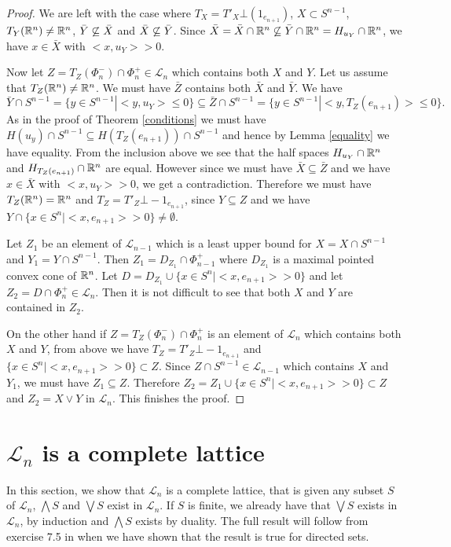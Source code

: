 \documentclass[psamsfonts]{amsart}
\numberwithin{equation}{subsection}
\theoremstyle{plain}
\theoremstyle{definition}
\theoremstyle{remark}
\begin{document}
\begin{proof}
We are left with the case where $T_X = T'_X \bot ( 1_{e_{n + 1}})$,  $X \subset S^{n - 1}$,  $T_Y(\Bbb{R}^n)\not= \Bbb{R}^n$,
$\Bar{Y} \not \subseteq \bar{X}$ and $\Bar{X} \not \subseteq \bar{Y}$. 
  Since  $\bar{X} = \bar{X} \cap \Bbb{R}^n \not\subseteq \bar{Y}  \cap \Bbb{R}^n = H_{u_Y} \cap \Bbb{R}^n$,  we have $x \in \bar{X}$ with $<x, u_Y> > 0$. 


 Now let $Z = T_Z(\Phi_{n}^- )\cap \Phi_{n}^+ \in \mathcal{L}_n$ which contains both $X$ and $Y$. Let us assume that 
 $T_Z(\Bbb{R}^n) \not= \Bbb{R}^n$.  
We must have $\bar{Z}$ contains both $\bar{X}$ and $\bar{Y}$. We have  
{\small $${ \bar{Y} \cap S^{n - 1} = \{y \in S^{n -1} | 
<y, u_Y> \leq 0\} \subseteq \bar{Z} \cap S^{n - 1} = \{y \in S^{n -1} | 
<y, T_Z(e_{n + 1})> \leq 0\}.}$$}
 As in the proof of Theorem  \ref{conditions} 
we must have $H(u_y) \cap S^{n - 1} \subseteq H(T_Z(e_{n + 1})) \cap S^{n - 1}$ and hence by 
Lemma \ref{equality} we have equality. From the inclusion above we see that the half spaces 
$H_{u_Y} \cap \Bbb{R}^n$ and $H_{T_Z(e_{n + 1})} \cap \Bbb{R}^n$ are equal.
 However since we must have $\bar{X} \subseteq \bar{Z}$ and we have 
$x \in \bar{X}$ with $<x, u_Y> > 0$, we get  a contradiction. Therefore we must have $T_Z(\Bbb{R}^n) = 
\Bbb{R}^n$ and $T_Z = T'_Z \bot -1_{e_{n + 1}}$, since $Y \subseteq Z$ and we have $Y\cap \{x \in S^n| <x, e_{n + 1}> > 0 \} \not= \emptyset$. 

Let $Z_1 $ be an element of  $ \mathcal{L}_{n - 1}$ which is a least upper bound 
for $X = X \cap S^{n - 1}$ and $Y_1 = Y\cap S^{n - 1}$. Then $Z_1  = D_{Z_1} \cap \Phi_{n-1}^+$  where $D_{Z_1}$ is a maximal pointed convex cone 
of $\Bbb{R}^n$. Let $D = D_{Z_1} \cup \{x \in S^n | <x, e_{n +1}> > 0\}$ and let $Z_2 = D \cap \Phi_n^+ \in \mathcal{L}_n$. Then 
it is not difficult to see that  both $X$ and $Y$ are contained in $Z_2$. 

On the other hand if $Z = T_Z(\Phi_{n}^-) \cap \Phi_{n}^+$ is an element of  $\mathcal{L}_n$ which contains both $X$ and $Y$, from above  we have $T_Z = T'_Z \bot -1_{e_{n + 1}}$ and 
$\{x \in S^n | <x, e_{n +1}> > 0\} \subset Z$. Since $Z\cap S^{n - 1} \in \mathcal{L}_{n - 1}$ which 
contains $X$ and $Y_1$, we must have $Z_1 \subseteq Z$. Therefore $Z_2 = Z_1 \cup \{x \in S^n | <x, e_{n +1}> > 0\} \subset Z$ and $Z_2 = X\vee Y$ in $\mathcal{L}_n$. This finishes the proof. 
\end{proof}


\section{$\mathcal{L}_{n }$ is a complete lattice }
In this section, we show that $\mathcal{L}_{n }$ is a complete lattice, that is given any subset $S$ of $\mathcal{L}_{n }$,
$\bigwedge S$ and $\bigvee S$ exist in $\mathcal{L}_{n }$.
If $S$ is finite, we already have that $\bigvee S$ exists in $\mathcal{L}_{n }$, by induction and $\bigwedge S$ exists by 
duality. 
 The full result  will follow from exercise 7.5 in \cite{DnP} when we have shown that the result is true for directed sets. 
\end{document}
